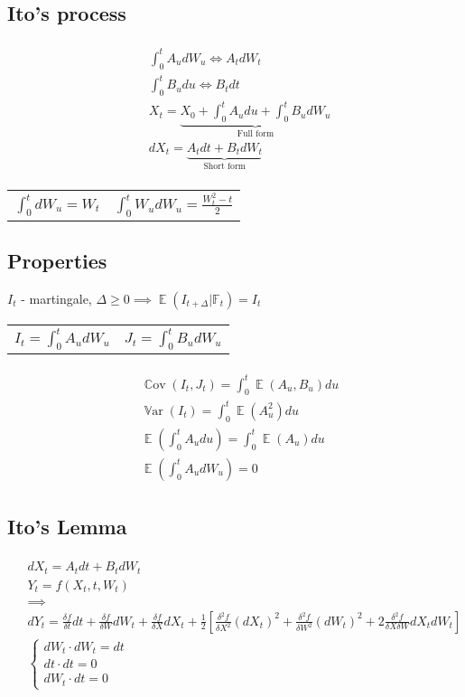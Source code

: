 \documentclass{article}
\def\Var#1{{\operatorname{\mathbb{V}ar} \left({#1}\right)}}
\def\Cov#1{{\operatorname{\mathbb{C}ov} \left({#1}\right)}}
\def\Exp#1{{\operatorname{\mathbb{E}} \left({#1}\right)}}
\def\Eq#1{{\begin{gather}\begin{split} #1 \end{split}\end{gather}}}
\begin{document}
\begin{multicols}{2}
    \subsection*{Ito's process}
    \Eq{
        &\int_0^t A_u dW_u \iff A_t dW_t \\
        &\int_0^t B_u du \iff B_t dt \\
        &X_t = \underbrace{X_0 + \int_0^t A_u du + \int_0^t B_u dW_u}_{\text{Full form}}\\
        &dX_t = \underbrace{A_t dt + B_t dW_t}_{\text{Short form}}
    }
    \begin{center}
    \begin{tabular}{l l}
    $\int_0^t dW_u = W_t$ &
    $\int_0^t W_u dW_u = \frac{W_t^2 - t}{2}$
    \end{tabular}
    \end{center}
    \subsection*{Properties}
    $I_t$ - martingale, $\Delta \geq 0 \implies \Exp{I_{t + \Delta} | \mathbb{F}_t} = I_t$
    \begin{center}
    \begin{tabular}{l l}
    $I_t = \int_0^t A_u dW_u$ & $J_t = \int_0^t B_u dW_u$ \\
    \end{tabular}
    \end{center}
    \Eq
    {
        &\Cov{ I_t, J_t } = \int_0^t \Exp{A_u, B_u} du \\
        &\Var{ I_t } = \int_0^t \Exp{A_u^2} du \\
        &\Exp{\int_0^t A_u du} = \int_0^t \Exp{A_u} du \\
        &\Exp{\int_0^t A_u dW_u} = 0
    }
\end{multicols}
\subsection*{Ito's Lemma} 
\Eq{
    &dX_t = A_t dt + B_t dW_t \\
    &Y_t = f(X_t, t, W_t) \\
    & \implies \\
    &dY_t = \frac{\delta f}{\delta t} dt + \frac{\delta f}{\delta W}dW_t + \frac{\delta f}{\delta X}dX_t + \frac{1}{2}\left[\frac{\delta^2 f}{\delta X^2}(dX_t)^2 + \frac{\delta^2 f}{\delta W^2}(dW_t)^2 + 2\frac{\delta^2 f}{\delta X \delta W}dX_t dW_t\right]\\
    &\begin{cases}
        dW_t \cdot dW_t = dt\\
        dt \cdot dt = 0\\
        dW_t \cdot dt = 0
    \end{cases}
}
\end{document}
